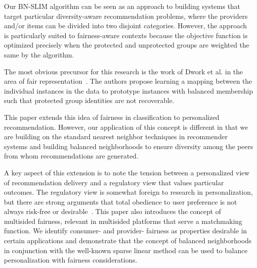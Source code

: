 Our BN-SLIM algorithm can be seen as an approach to building systems that target particular diversity-aware recommendation problems, where the providers and/or items can be divided into two disjoint categories. However, the approach is particularly suited to fairness-aware contexts because the objective function is optimized precisely when the protected and unprotected groups are weighted the same by the algorithm. 

The most obvious precursor for this research is the work of Dwork et al. in the area of fair representation~\cite{zemel2013learning,fairness}. The authors propose learning a mapping between the individual instances in the data to prototype instances with balanced membership such that protected group identities are not recoverable.

This paper extends this idea of fairness in classification to personalized recommendation. However, our application of this concept is different in that we are building on the standard nearest neighbor techniques in recommender systems and building balanced neighborhoods to ensure diversity among the peers from whom recommendations are generated. 

A key aspect of this extension is to note the tension between a personalized view of recommendation delivery and a regulatory view that values particular outcomes. The regulatory view is somewhat foreign to research in personalization, but there are strong arguments that total obedience to user preference is not always risk-free or desirable~\cite{pariser2011filter,sunstein2009republic}. This paper also introduces the concept of multisided fairness, relevant in multisided platforms that serve a matchmaking function. We identify consumer- and provider- fairness as properties desirable in certain applications and demonstrate that the concept of balanced neighborhoods in conjunction with the well-known sparse linear method can be used to balance personalization with fairness considerations.

